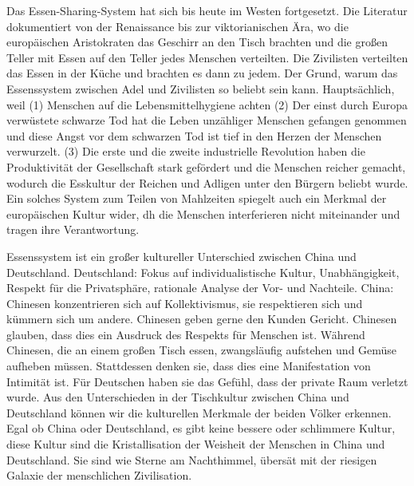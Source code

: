 \mypar
Das Essen-Sharing-System hat sich bis heute im Westen fortgesetzt. Die Literatur dokumentiert von der Renaissance bis zur viktorianischen Ära, wo die europäischen Aristokraten das Geschirr an den Tisch brachten und die großen Teller mit Essen auf den Teller jedes Menschen verteilten. Die Zivilisten verteilten das Essen in der Küche und brachten es dann zu jedem. Der Grund, warum das Essenssystem zwischen Adel und Zivilisten so beliebt sein kann. Hauptsächlich, weil (1)  Menschen auf die Lebensmittelhygiene achten (2) Der einst durch Europa verwüstete schwarze Tod hat die Leben unzähliger Menschen gefangen genommen und diese Angst vor dem schwarzen Tod ist tief in den Herzen der Menschen verwurzelt. (3) Die erste und die zweite industrielle Revolution haben die Produktivität der Gesellschaft stark gefördert und die Menschen reicher gemacht, wodurch die Esskultur der Reichen und Adligen unter den Bürgern beliebt wurde. Ein solches System zum Teilen von Mahlzeiten spiegelt auch ein Merkmal der europäischen Kultur wider, dh die Menschen interferieren nicht miteinander und tragen ihre Verantwortung.

\mypar
Essenssystem ist ein großer kultureller Unterschied zwischen China und Deutschland. Deutschland: Fokus auf individualistische Kultur, Unabhängigkeit, Respekt für die Privatsphäre, rationale Analyse der Vor- und Nachteile. China: Chinesen konzentrieren sich auf Kollektivismus, sie respektieren sich und kümmern sich um andere. Chinesen geben gerne den Kunden Gericht. Chinesen glauben, dass dies ein Ausdruck des Respekts für Menschen ist. Während Chinesen, die an einem großen Tisch essen, zwangsläufig aufstehen und Gemüse aufheben müssen. Stattdessen denken sie, dass dies eine Manifestation von Intimität ist. Für Deutschen haben sie das Gefühl, dass der private Raum verletzt wurde.
Aus den Unterschieden in der Tischkultur zwischen China und Deutschland können wir die kulturellen Merkmale der beiden Völker erkennen. Egal ob China oder Deutschland, es gibt keine bessere oder schlimmere Kultur, diese Kultur sind die Kristallisation der Weisheit der Menschen in China und Deutschland. Sie sind wie Sterne am Nachthimmel, übersät mit der riesigen Galaxie der menschlichen Zivilisation.